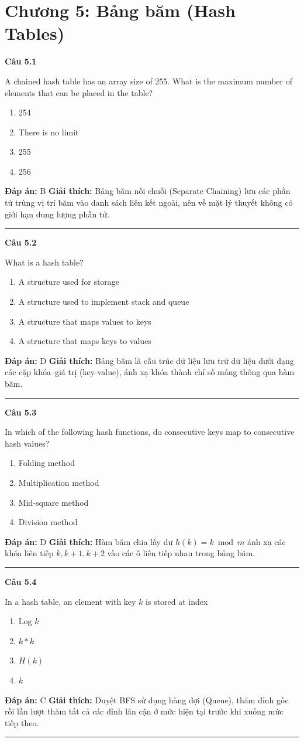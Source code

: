 \documentclass[11pt,a4paper]{article}
\newenvironment{question}[1]{%
  \par\vspace{1em}\noindent\textbf{\large Câu #1}\par\vspace{0.4em}
}{%
  \par\vspace{1em}\hrule\vspace{0.6em}
}
\newenvironment{choices}{%
  \begin{enumerate}[label=\textbf{\Alph*.},leftmargin=2.2em,itemsep=2pt,topsep=3pt]
}{%
  \end{enumerate}
}
\newcommand{\choice}{\item}
\begin{document}
\newpage
\section*{Chương 5: Bảng băm (Hash Tables)}


\begin{question}{5.1}
A chained hash table has an array size of 255. What is the maximum number of elements that can be placed in the table?
\begin{choices}
\choice 254
\choice There is no limit
\choice 255
\choice 256
\end{choices}
\textbf{Đáp án:} B
\textbf{Giải thích:} Bảng băm nối chuỗi (Separate Chaining) lưu các phần tử trùng vị trí băm vào danh sách liên kết ngoài, nên về mặt lý thuyết không có giới hạn dung lượng phần tử.
\end{question}

\begin{question}{5.2}
What is a hash table?
\begin{choices}
\choice A structure used for storage
\choice A structure used to implement stack and queue
\choice A structure that maps values to keys
\choice A structure that maps keys to values
\end{choices}
\textbf{Đáp án:} D
\textbf{Giải thích:} Bảng băm là cấu trúc dữ liệu lưu trữ dữ liệu dưới dạng các cặp khóa--giá trị (key-value), ánh xạ khóa thành chỉ số mảng thông qua hàm băm.
\end{question}

\begin{question}{5.3}
In which of the following hash functions, do consecutive keys map to consecutive hash values?
\begin{choices}
\choice Folding method
\choice Multiplication method
\choice Mid-square method
\choice Division method
\end{choices}
\textbf{Đáp án:} D
\textbf{Giải thích:} Hàm băm chia lấy dư \(h(k) = k \bmod m\) ánh xạ các khóa liên tiếp \(k, k+1, k+2\) vào các ô liên tiếp nhau trong bảng băm.
\end{question}

\begin{question}{5.4}
In a hash table, an element with key \(k\) is stored at index
\begin{choices}
\choice \(\text{Log } k\)
\choice \(k * k\)
\choice \(H(k)\)
\choice \(k\)
\end{choices}
\textbf{Đáp án:} C
\textbf{Giải thích:} Duyệt BFS sử dụng hàng đợi (Queue), thăm đỉnh gốc rồi lần lượt thăm tất cả các đỉnh lân cận ở mức hiện tại trước khi xuống mức tiếp theo.
\end{question}
\end{document}
